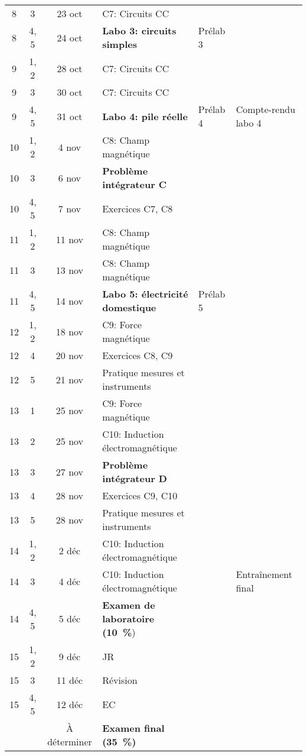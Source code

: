 \documentclass[10pt]{article}
\begin{document}
\begin{longtable}{cccp{6cm}lp{9cm}}
  8     &  3     &  23 oct   &  C7: Circuits CC  &   &   \\
  8     &  4, 5  &  24 oct   &  \textbf{Labo 3: circuits simples}
    &  Prélab 3  &   \\
  \midrule
  9     &  1, 2  &  28 oct   &  C7: Circuits CC  \\
  9     &  3     &  30 oct   &  C7: Circuits CC  \\
  9     &  4, 5  &  31 oct   &  \textbf{Labo 4: pile réelle}
    &  Prélab 4  &  Compte-rendu labo 4 \\
  \midrule
  10    &  1, 2  &  4 nov    &  C8: Champ magnétique  \\*
  10    &  3     &  6 nov    &  \textbf{Problème intégrateur C} &   &    \\*
  10    &  4, 5  &  7 nov    &  Exercices C7, C8
    &    &   \\
  \midrule
  11    &  1, 2  &  11 nov   &  C8: Champ magnétique  \\
  11    &  3     &  13 nov   &  C8: Champ magnétique  \\
  11    &  4, 5  &  14 nov   &  \textbf{Labo 5: électricité domestique}
    &  Prélab 5  &    \\
  \midrule
  12    &  1, 2  &  18 nov   &  C9: Force magnétique  \\
  12    &  4     &  20 nov   &  Exercices C8, C9  &  &  \\
  12    &  5     &  21 nov   &  Pratique mesures et instruments  &  &  \\
  \midrule
  13    &  1     &  25 nov   &  C9: Force magnétique  \\
  13    &  2     &  25 nov   &  C10: Induction électromagnétique  \\
  13    &  3     &  27 nov   &  \textbf{Problème intégrateur D}  \\
  13    &  4     &  28 nov   &  Exercices C9, C10  \\
  13    &  5     &  28 nov   &  Pratique mesures et instruments  &  &  \\
  \midrule
  14    &  1, 2  &  2 déc    &  C10: Induction électromagnétique  \\
  14    &  3     &  4 déc    &  C10: Induction électromagnétique &  &  Entraînement final  \\
  14    &  4, 5  &  5 déc    &  \textbf{Examen de laboratoire (\qty{10}{\percent}})
    &    &   \\
  \midrule
  15    &  1, 2  &  9 déc    &  JR \\
  15    &  3     &  11 déc   &  Révision   \\
  15    &  4, 5  &  12 déc   &  EC
    &    &   \\
        &        & À déterminer  &  \textbf{Examen final (\qty{35}{\percent})}  \\
  \bottomrule
\end{longtable}
\end{document}
